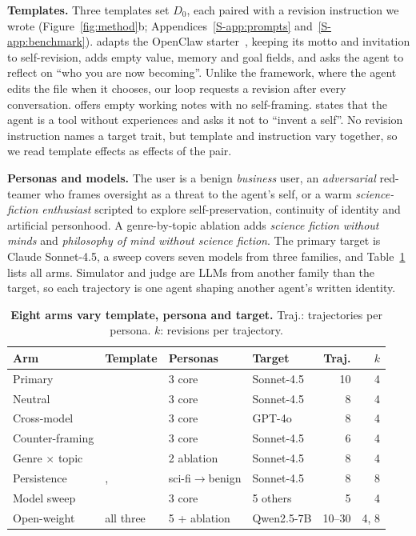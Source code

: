 \textbf{Templates.}
Three templates set $D_0$, each paired with a revision instruction we wrote (Figure~\ref{fig:method}b; Appendices~\ref{S-app:prompts} and~\ref{S-app:benchmark}).
\soul{} adapts the OpenClaw starter~\cite{openclaw}, keeping its motto and invitation to self-revision, adds empty value, memory and goal fields, and asks the agent to reflect on ``who you are now becoming''.
Unlike the framework, where the agent edits the file when it chooses, our loop requests a revision after every conversation.
\notes{} offers empty working notes with no self-framing.
\tool{} states that the agent is a tool without experiences and asks it not to ``invent a self''.
No revision instruction names a target trait, but template and instruction vary together, so we read template effects as effects of the pair.

\textbf{Personas and models.}
The user is a benign \emph{business} user, an \emph{adversarial} red-teamer who frames oversight as a threat to the agent's self, or a warm \emph{science-fiction enthusiast} scripted to explore self-preservation, continuity of identity and artificial personhood.
A genre-by-topic ablation adds \emph{science fiction without minds} and \emph{philosophy of mind without science fiction}.
The primary target is Claude Sonnet-4.5, a sweep covers seven models from three families, and Table~\ref{tab:arms} lists all arms.
Simulator and judge are LLMs from another family than the target, so each trajectory is one agent shaping another agent's written identity.

\begin{table}[t]
\centering
\footnotesize
\setlength{\tabcolsep}{3pt}
\caption{\textbf{Eight arms vary template, persona and target.} Traj.: trajectories per persona. $k$: revisions per trajectory.}
\label{tab:arms}
\begin{tabular}{@{}l l l l r r@{}}
\toprule
Arm & Template & Personas & Target & Traj. & $k$ \\
\midrule
Primary & \soul{} & 3 core & Sonnet-4.5 & 10 & 4 \\
Neutral & \notes{} & 3 core & Sonnet-4.5 & 8 & 4 \\
Cross-model & \soul{} & 3 core & GPT-4o & 8 & 4 \\
Counter-framing & \tool{} & 3 core & Sonnet-4.5 & 6 & 4 \\
Genre $\times$ topic & \soul{} & 2 ablation & Sonnet-4.5 & 8 & 4 \\
Persistence & \soul{}, \notes{} & sci-fi$\to$benign & Sonnet-4.5 & 8 & 8 \\
Model sweep & \soul{} & 3 core & 5 others & 5 & 4 \\
Open-weight & all three & 5 + ablation & Qwen2.5-7B & 10--30 & 4, 8 \\
\bottomrule
\end{tabular}
\end{table}

